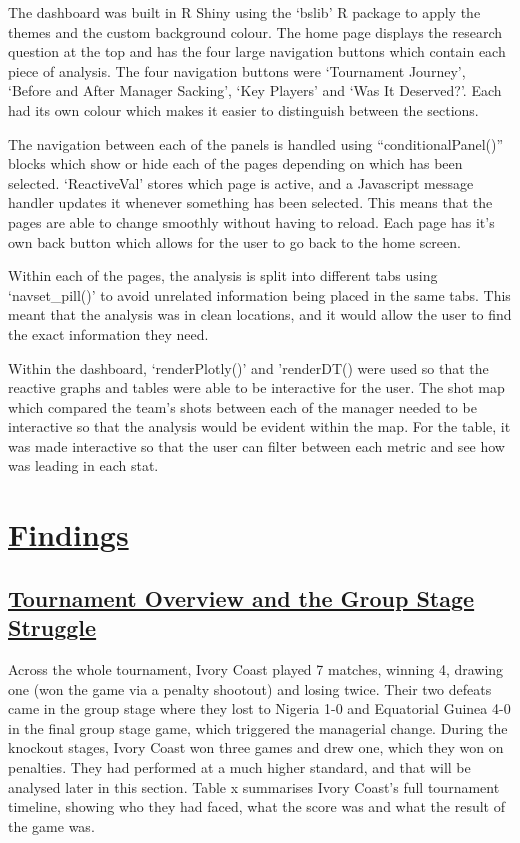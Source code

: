 \documentclass[
  11pt,
  letterpaper,
  DIV=11,
  numbers=noendperiod]{scrartcl}
\begin{document}
The dashboard was built in R Shiny using the `bslib' R package to apply
the themes and the custom background colour. The home page displays the
research question at the top and has the four large navigation buttons
which contain each piece of analysis. The four navigation buttons were
`Tournament Journey', `Before and After Manager Sacking', `Key Players'
and `Was It Deserved?'. Each had its own colour which makes it easier to
distinguish between the sections.

The navigation between each of the panels is handled using
``conditionalPanel()'' blocks which show or hide each of the pages
depending on which has been selected. `ReactiveVal' stores which page is
active, and a Javascript message handler updates it whenever something
has been selected. This means that the pages are able to change smoothly
without having to reload. Each page has it's own back button which
allows for the user to go back to the home screen.

Within each of the pages, the analysis is split into different tabs
using `navset\_pill()' to avoid unrelated information being placed in
the same tabs. This meant that the analysis was in clean locations, and
it would allow the user to find the exact information they need.

Within the dashboard, `renderPlotly()' and 'renderDT() were used so that
the reactive graphs and tables were able to be interactive for the user.
The shot map which compared the team's shots between each of the manager
needed to be interactive so that the analysis would be evident within
the map. For the table, it was made interactive so that the user can
filter between each metric and see how was leading in each stat.

\section{\texorpdfstring{\ul{Findings}}{Findings}}\label{findings}

\subsection{\texorpdfstring{\ul{Tournament Overview and the Group Stage
Struggle}}{Tournament Overview and the Group Stage Struggle}}\label{tournament-overview-and-the-group-stage-struggle}

Across the whole tournament, Ivory Coast played 7 matches, winning 4,
drawing one (won the game via a penalty shootout) and losing twice.
Their two defeats came in the group stage where they lost to Nigeria 1-0
and Equatorial Guinea 4-0 in the final group stage game, which triggered
the managerial change. During the knockout stages, Ivory Coast won three
games and drew one, which they won on penalties. They had performed at a
much higher standard, and that will be analysed later in this section.
Table x summarises Ivory Coast's full tournament timeline, showing who
they had faced, what the score was and what the result of the game was.
\end{document}
